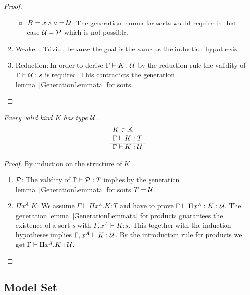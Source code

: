 \begin{theorem}
\begin{proof}
\begin{enumerate}
\begin{itemize}
            \item $B = x \land a = {\cal U}$: The generation lemma for sorts would
                require in that case ${\cal U} = {\cal P}$ which is not possible.
            \end{itemize}

        \item Weaken: Trivial, because the goal is the same as the induction
            hypothesis.

        \item Reduction:
            In order to derive $\Gamma \vdash K: {\cal U}$ by the reduction rule the
            validity of $\Gamma \vdash {\cal U} : s$ is required. This contradicts
            the generation lemma~\ref{GenerationLemmata} for sorts.
        \end{enumerate}
    \end{proof}
\end{theorem}

\begin{theorem}
    \label{KindImpliesTypeAny}
    \emph{Every valid kind $K$ has type ${\cal U}$.}
    $$
    \begin{array}{l} 
        K \in \mathbb{K}
        \\
        \Gamma \vdash K : T
     \\ \hline 
        \Gamma \vdash K: {\cal U}
    \end{array}
    $$
    \begin{proof}
        By induction on the structure of $K$
        \begin{enumerate}
        \item ${\cal P}$: The validity of $\Gamma \vdash {\cal P}: T$ implies by the
            generation lemma~\ref{GenerationLemmata} for sorts $T = {\cal U}$.

        \item $\Pi x^A. K$: We assume $\Gamma \vdash \Pi x^A.K : T$ and have to
            prove $\Gamma \vdash \Pi x^A: K : {\cal U}$. The generation
                lemma~\ref{GenerationLemmata} for products guarantees the
                existence of a sort $s$ with $\Gamma, x^A \vdash K: s$. This
                together with the induction hypotheses implies $\Gamma, x^A
                \vdash K: {\cal U}$. By
                the introduction rule for products we get $\Gamma \vdash \Pi
                x^A. K : {\cal U}$.
        \end{enumerate}
    \end{proof}
\end{theorem}



\subsection{Model Set}

